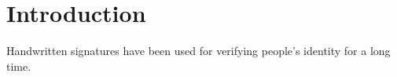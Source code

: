 \section{Introduction}\label{sec:introduction}
Handwritten signatures have been used for verifying people's identity for a long time.
